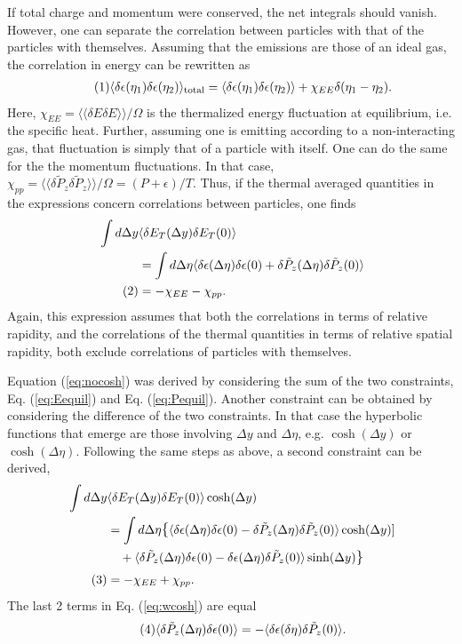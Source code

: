 \documentclass[12pt]{article}
\numberwithin{equation}{section}
\numberwithin{figure}{section}
\newcommand\eqnumber{\addtocounter{equation}{1}\tag{\theequation}}
\begin{document}
If total charge and momentum were conserved, the net integrals should vanish. However, one can separate the correlation between particles with that of the particles with themselves. Assuming that the emissions are those of an ideal gas, the correlation in energy can be rewritten as
\begin{align*}\eqnumber
\langle \delta\epsilon(\eta_1)\delta\epsilon(\eta_2)\rangle_{\rm total}
=\langle \delta\epsilon(\eta_1)\delta\epsilon(\eta_2)\rangle+\chi_{EE}\delta(\eta_1-\eta_2).
\end{align*}
Here, $\chi_{EE}=\langle\langle \delta E\delta E\rangle\rangle/\Omega$ is the thermalized energy fluctuation at equilibrium, i.e. the specific heat. Further, assuming one is emitting according to a non-interacting gas, that fluctuation is simply that of a particle with itself. One can do the same for the the momentum fluctuations. In that case, $\chi_{pp}=\langle\langle \delta \tilde{P}_z\delta \tilde{P}_z\rangle\rangle/\Omega=(P+\epsilon)/T$. Thus, if the thermal averaged quantities in the expressions concern correlations between particles, one finds
\begin{align*}
\int d\Delta y&\langle \delta E_T(\Delta y)\delta E_T(0)\rangle\\
&=\int d\Delta\eta\langle \delta\epsilon(\Delta\eta)\delta\epsilon(0)+\delta\tilde{P}_z(\Delta\eta)\delta\tilde{P}_z(0)\rangle\\
\eqnumber\label{eq:nocosh}
&=-\chi_{EE}-\chi_{pp}.
\end{align*}
Again, this expression assumes that both the correlations in terms of relative rapidity, and the correlations of the thermal quantities in terms of relative spatial rapidity, both exclude correlations of particles with themselves.

Equation (\ref{eq:nocosh}) was derived by considering the sum of the two constraints, Eq. (\ref{eq:Eequil}) and Eq. (\ref{eq:Pequil}). Another constraint can be obtained by considering the difference of the two constraints. In that case the hyperbolic functions that emerge are those involving $\Delta y$ and $\Delta\eta$, e.g. $\cosh(\Delta y)$ or $\cosh(\Delta\eta)$. Following the same steps as above, a second constraint can be derived,
\begin{align*}
\int d\Delta y &\langle \delta E_T(\Delta y)\delta E_T(0)\rangle\cosh(\Delta y)\\
&=\int d\Delta\eta\mathlarger{\{}\langle \delta\epsilon(\Delta\eta)\delta\epsilon(0)-\delta\tilde{P}_z(\Delta\eta)\delta\tilde{P}_z(0)\rangle\cosh(\Delta y)]\\
&~~~+\langle \delta\tilde{P}_z(\Delta\eta)\delta\epsilon(0)-\delta\epsilon(\Delta\eta)\delta\tilde{P}_z(0)\rangle\sinh(\Delta y)\mathlarger{\}}\\
\eqnumber\label{eq:wcosh}
&=-\chi_{EE}+\chi_{pp}.
\end{align*}
The last 2 terms in Eq. (\ref{eq:wcosh}) are equal
\begin{align*}\eqnumber
\langle\delta\tilde{P}_z(\Delta\eta)\delta\epsilon(0)\rangle=
-\langle\delta\epsilon(\delta\eta)\delta\tilde{P}_z(0)\rangle.
\end{align*}
\end{document}
